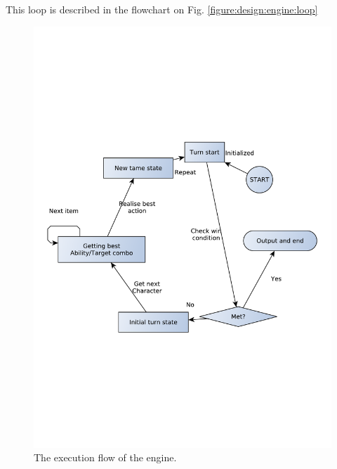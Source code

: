 This loop is described in the flowchart on Fig. \vref{figure:design:engine:loop}

\begin{figure}[h]
\centering
\includegraphics[scale=0.5, clip=true, trim=1cm 8cm 1cm 8cm]{img/engine_exec_loop}
\caption{\label{figure:design:engine:loop}The execution flow of the engine.}
\end{figure}